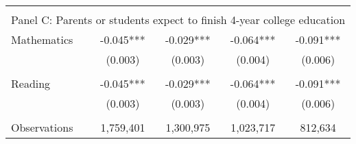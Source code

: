 {\begin{tabular}{lcccc}
&  &  & &  \\
\multicolumn{5}{l}{Panel C: Parents or students expect to finish 4-year college education} \\
Mathematics         &      -0.045***&      -0.029***&      -0.064***&      -0.091***\\
                    &     (0.003)   &     (0.003)   &     (0.004)   &     (0.006)   \\
 
&  &  & &  \\
Reading             &      -0.045***&      -0.029***&      -0.064***&      -0.091***\\
                    &     (0.003)   &     (0.003)   &     (0.004)   &     (0.006)   \\
                    &               &               &               &               \\
Observations        &   1,759,401   &   1,300,975   &   1,023,717   &     812,634   \\
 

\bottomrule
\end{tabular}
}
